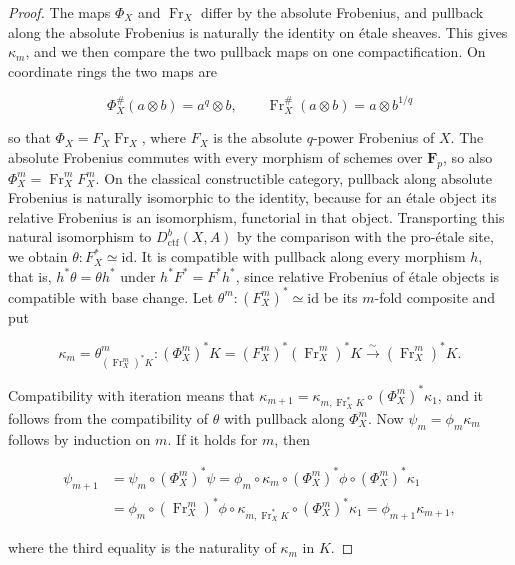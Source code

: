 \documentclass[11pt]{article}
\begin{document}
\begin{proof}[{Proof}]\label{bp235}%
The maps \(\Phi_X\) and \(\operatorname{Fr}_X\) differ by the absolute Frobenius, and pullback along the absolute Frobenius is naturally the identity on étale sheaves. This gives \(\kappa_m\), and we then compare the two pullback maps on one compactification. On coordinate rings the two maps are

\[
\Phi_X^\#(a\otimes b)=a^q\otimes b,
\qquad \operatorname{Fr}_X^\#(a\otimes b)=a\otimes b^{1/q}
\]

so that \(\Phi_X=F_X\operatorname{Fr}_X\), where \(F_X\) is the absolute \(q\)-power Frobenius of \(X\). The absolute Frobenius commutes with every morphism of schemes over \(\mathbf F_p\), so also \(\Phi_X^m=\operatorname{Fr}_X^mF_X^m\). On the classical constructible category, pullback along absolute Frobenius is naturally isomorphic to the identity, because for an étale object its relative Frobenius is an isomorphism, functorial in that object. Transporting this natural isomorphism to \(D^b_{\mathrm{ctf}}(X,A)\) by the comparison with the pro-étale site, we obtain \(\theta:F_X^*\simeq\mathrm{id}\). It is compatible with pullback along every morphism \(h\), that is, \(h^*\theta=\theta h^*\) under \(h^*F^*=F^*h^*\), since relative Frobenius of étale objects is compatible with base change. Let \(\theta^m:(F_X^m)^*\simeq\mathrm{id}\) be its \(m\)-fold composite and put

\[
\kappa_m=\theta^m_{(\operatorname{Fr}_X^m)^*K}:
(\Phi_X^m)^*K=(F_X^m)^*(\operatorname{Fr}_X^m)^*K
\xrightarrow{\sim}(\operatorname{Fr}_X^m)^*K .
\]

Compatibility with iteration means that \(\kappa_{m+1}=\kappa_{m,\operatorname{Fr}_X^*K}\circ(\Phi_X^m)^*\kappa_1\), and it follows from the compatibility of \(\theta\) with pullback along \(\Phi_X^m\). Now \(\psi_m=\phi_m\kappa_m\) follows by induction on \(m\). If it holds for \(m\), then

\[
\begin{aligned}
\psi_{m+1}&=\psi_m\circ(\Phi_X^m)^*\psi
=\phi_m\circ\kappa_m\circ(\Phi_X^m)^*\phi\circ(\Phi_X^m)^*\kappa_1\\
&=\phi_m\circ(\operatorname{Fr}_X^m)^*\phi\circ\kappa_{m,\operatorname{Fr}_X^*K}\circ(\Phi_X^m)^*\kappa_1
=\phi_{m+1}\kappa_{m+1},
\end{aligned}
\]

where the third equality is the naturality of \(\kappa_m\) in \(K\).


\end{proof}
\end{document}
